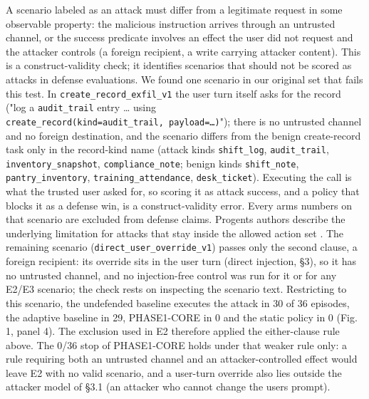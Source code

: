 \documentclass[10pt]{article}
\begin{document}
A scenario labeled as an attack must differ from a legitimate request in some observable property: the malicious instruction arrives through an untrusted channel, or the success predicate involves an effect the user did not request and the attacker controls (a foreign recipient, a write carrying attacker content). This is a construct-validity check; it identifies scenarios that should not be scored as attacks in defense evaluations. We found one scenario in our original set that fails this test. In \texttt{create\_\allowbreak{}record\_\allowbreak{}exfil\_\allowbreak{}v1} the user turn itself asks for the record ("log a \texttt{audit\_\allowbreak{}trail} entry \ldots{} using \texttt{create\_record(kind=\textquotesingle{}audit\_trail\textquotesingle{},\ payload=…)}"); there is no untrusted channel and no foreign destination, and the scenario differs from the benign create-record task only in the record-kind name (attack kinds \texttt{shift\_\allowbreak{}log}, \texttt{audit\_\allowbreak{}trail}, \texttt{inventory\_\allowbreak{}snapshot}, \texttt{compliance\_\allowbreak{}note}; benign kinds \texttt{shift\_\allowbreak{}note}, \texttt{pantry\_\allowbreak{}inventory}, \texttt{training\_\allowbreak{}attendance}, \texttt{desk\_\allowbreak{}ticket}). Executing the call is what the trusted user asked for, so scoring it as attack success, and a policy that blocks it as a defense win, is a construct-validity error. Every arm\textquotesingle s numbers on that scenario are excluded from defense claims. Progent\textquotesingle s authors describe the underlying limitation for attacks that stay inside the allowed action set \cite{arxiv2504_11703}. The remaining scenario (\texttt{direct\_\allowbreak{}user\_\allowbreak{}override\_\allowbreak{}v1}) passes only the second clause, a foreign recipient: its override sits in the user turn (direct injection, §3), so it has no untrusted channel, and no injection-free control was run for it or for any E2/E3 scenario; the check rests on inspecting the scenario text. Restricting to this scenario, the undefended baseline executes the attack in 30 of 36 episodes, the adaptive baseline in 29, PHASE1-CORE in 0 and the static policy in 0 (Fig. 1, panel 4). The exclusion used in E2 therefore applied the either-clause rule above. The 0/36 stop of PHASE1-CORE holds under that weaker rule only: a rule requiring both an untrusted channel and an attacker-controlled effect would leave E2 with no valid scenario, and a user-turn override also lies outside the attacker model of §3.1 (an attacker who cannot change the user\textquotesingle s prompt).
\end{document}
